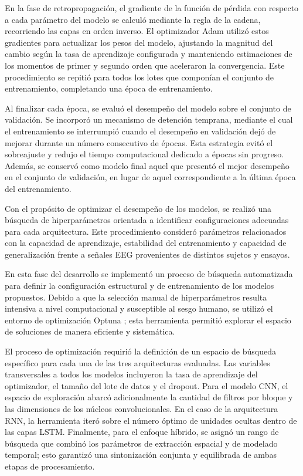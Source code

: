 En la fase de retropropagación, el gradiente de la función de pérdida con respecto a cada parámetro del modelo se calculó mediante la regla de la cadena, recorriendo las capas en orden inverso. El optimizador Adam \cite{kingma2014adam} utilizó estos gradientes para actualizar los pesos del modelo, ajustando la magnitud del cambio según la tasa de aprendizaje configurada y manteniendo estimaciones de los momentos de primer y segundo orden que aceleraron la convergencia. Este procedimiento se repitió para todos los lotes que componían el conjunto de entrenamiento, completando una época de entrenamiento.

Al finalizar cada época, se evaluó el desempeño del modelo sobre el conjunto de validación. Se incorporó un mecanismo de detención temprana, mediante el cual el entrenamiento se interrumpió cuando el desempeño en validación dejó de mejorar durante un número consecutivo de épocas. Esta estrategia evitó el sobreajuste y redujo el tiempo computacional dedicado a épocas sin progreso. Además, se conservó como modelo final aquel que presentó el mejor desempeño en el conjunto de validación, en lugar de aquel correspondiente a la última época del entrenamiento.

Con el propósito de optimizar el desempeño de los modelos, se realizó una búsqueda de hiperparámetros orientada a identificar configuraciones adecuadas para cada arquitectura. Este procedimiento consideró parámetros relacionados con la capacidad de aprendizaje, estabilidad del entrenamiento y capacidad de generalización frente a señales EEG provenientes de distintos sujetos y ensayos.

En esta fase del desarrollo se implementó un proceso de búsqueda automatizada para definir la configuración estructural y de entrenamiento de los modelos propuestos. Debido a que la selección manual de hiperparámetros resulta intensiva a nivel computacional y susceptible al sesgo humano, se utilizó el entorno de optimización Optuna \cite{akiba2019optuna}; esta herramienta permitió explorar el espacio de soluciones de manera eficiente y sistemática.

El proceso de optimización requirió la definición de un espacio de búsqueda específico para cada una de las tres arquitecturas evaluadas. Las variables transversales a todos los modelos incluyeron la tasa de aprendizaje del optimizador, el tamaño del lote de datos y el dropout. Para el modelo CNN, el espacio de exploración abarcó adicionalmente la cantidad de filtros por bloque y las dimensiones de los núcleos convolucionales. En el caso de la arquitectura RNN, la herramienta iteró sobre el número óptimo de unidades ocultas dentro de las capas LSTM. Finalmente, para el enfoque híbrido, se asignó un rango de búsqueda que combinó los parámetros de extracción espacial y de modelado temporal; esto garantizó una sintonización conjunta y equilibrada de ambas etapas de procesamiento.

